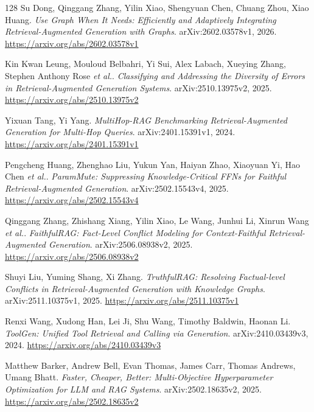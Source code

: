 \documentclass[11pt,a4paper]{article}
\begin{document}
\begin{thebibliography}{128}
Su Dong, Qinggang Zhang, Yilin Xiao, Shengyuan Chen, Chuang Zhou, Xiao Huang.
\newblock \emph{Use Graph When It Needs: Efficiently and Adaptively Integrating Retrieval-Augmented Generation with Graphs}.
\newblock arXiv:2602.03578v1, 2026.
\newblock \url{https://arxiv.org/abs/2602.03578v1}

Kin Kwan Leung, Mouloud Belbahri, Yi Sui, Alex Labach, Xueying Zhang, Stephen Anthony Rose \emph{et al.}.
\newblock \emph{Classifying and Addressing the Diversity of Errors in Retrieval-Augmented Generation Systems}.
\newblock arXiv:2510.13975v2, 2025.
\newblock \url{https://arxiv.org/abs/2510.13975v2}

Yixuan Tang, Yi Yang.
\newblock \emph{MultiHop-RAG Benchmarking Retrieval-Augmented Generation for Multi-Hop Queries}.
\newblock arXiv:2401.15391v1, 2024.
\newblock \url{https://arxiv.org/abs/2401.15391v1}

Pengcheng Huang, Zhenghao Liu, Yukun Yan, Haiyan Zhao, Xiaoyuan Yi, Hao Chen \emph{et al.}.
\newblock \emph{ParamMute: Suppressing Knowledge-Critical FFNs for Faithful Retrieval-Augmented Generation}.
\newblock arXiv:2502.15543v4, 2025.
\newblock \url{https://arxiv.org/abs/2502.15543v4}

Qinggang Zhang, Zhishang Xiang, Yilin Xiao, Le Wang, Junhui Li, Xinrun Wang \emph{et al.}.
\newblock \emph{FaithfulRAG: Fact-Level Conflict Modeling for Context-Faithful Retrieval-Augmented Generation}.
\newblock arXiv:2506.08938v2, 2025.
\newblock \url{https://arxiv.org/abs/2506.08938v2}

Shuyi Liu, Yuming Shang, Xi Zhang.
\newblock \emph{TruthfulRAG: Resolving Factual-level Conflicts in Retrieval-Augmented Generation with Knowledge Graphs}.
\newblock arXiv:2511.10375v1, 2025.
\newblock \url{https://arxiv.org/abs/2511.10375v1}

Renxi Wang, Xudong Han, Lei Ji, Shu Wang, Timothy Baldwin, Haonan Li.
\newblock \emph{ToolGen: Unified Tool Retrieval and Calling via Generation}.
\newblock arXiv:2410.03439v3, 2024.
\newblock \url{https://arxiv.org/abs/2410.03439v3}

Matthew Barker, Andrew Bell, Evan Thomas, James Carr, Thomas Andrews, Umang Bhatt.
\newblock \emph{Faster, Cheaper, Better: Multi-Objective Hyperparameter Optimization for LLM and RAG Systems}.
\newblock arXiv:2502.18635v2, 2025.
\newblock \url{https://arxiv.org/abs/2502.18635v2}


\end{thebibliography}
\end{document}
